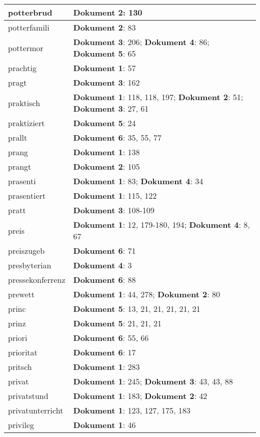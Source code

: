 \documentclass[a5paper]{article}
\begin{document}
\begin{longtable}[l]{|l|p{3in}|}
\hline
potterbrud & \textbf{Dokument 2}: 130 \\
\hline
potterfamili & \textbf{Dokument 2}: 83 \\
\hline
pottermor & \textbf{Dokument 3}: 206; \textbf{Dokument 4}: 86; \textbf{Dokument 5}: 65 \\
\hline
prachtig & \textbf{Dokument 1}: 57 \\
\hline
pragt & \textbf{Dokument 3}: 162 \\
\hline
praktisch & \textbf{Dokument 1}: 118, 118, 197; \textbf{Dokument 2}: 51; \textbf{Dokument 3}: 27, 61 \\
\hline
praktiziert & \textbf{Dokument 5}: 24 \\
\hline
prallt & \textbf{Dokument 6}: 35, 55, 77 \\
\hline
prang & \textbf{Dokument 1}: 138 \\
\hline
prangt & \textbf{Dokument 2}: 105 \\
\hline
prasenti & \textbf{Dokument 1}: 83; \textbf{Dokument 4}: 34 \\
\hline
prasentiert & \textbf{Dokument 1}: 115, 122 \\
\hline
pratt & \textbf{Dokument 3}: 108-109 \\
\hline
preis & \textbf{Dokument 1}: 12, 179-180, 194; \textbf{Dokument 4}: 8, 67 \\
\hline
preiszugeb & \textbf{Dokument 6}: 71 \\
\hline
presbyterian & \textbf{Dokument 4}: 3 \\
\hline
pressekonferrenz & \textbf{Dokument 6}: 88 \\
\hline
prewett & \textbf{Dokument 1}: 44, 278; \textbf{Dokument 2}: 80 \\
\hline
princ & \textbf{Dokument 5}: 13, 21, 21, 21, 21, 21 \\
\hline
prinz & \textbf{Dokument 5}: 21, 21, 21 \\
\hline
priori & \textbf{Dokument 6}: 55, 66 \\
\hline
prioritat & \textbf{Dokument 6}: 17 \\
\hline
pritsch & \textbf{Dokument 1}: 283 \\
\hline
privat & \textbf{Dokument 1}: 245; \textbf{Dokument 3}: 43, 43, 88 \\
\hline
privatstund & \textbf{Dokument 1}: 183; \textbf{Dokument 2}: 42 \\
\hline
privatunterricht & \textbf{Dokument 1}: 123, 127, 175, 183 \\
\hline
privileg & \textbf{Dokument 1}: 46 \\

\end{longtable}
\end{document}
